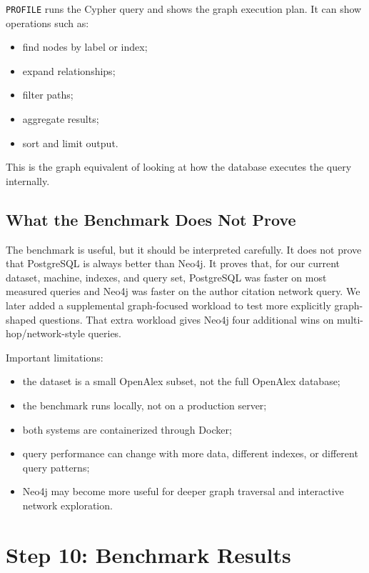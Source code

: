 \documentclass[11pt]{article}
\begin{document}
\texttt{PROFILE} runs the Cypher query and shows the graph execution plan.
It can show operations such as:

\begin{itemize}
    \item find nodes by label or index;
    \item expand relationships;
    \item filter paths;
    \item aggregate results;
    \item sort and limit output.
\end{itemize}

This is the graph equivalent of looking at how the database executes the query internally.

\subsection{What the Benchmark Does Not Prove}

The benchmark is useful, but it should be interpreted carefully.
It does not prove that PostgreSQL is always better than Neo4j.
It proves that, for our current dataset, machine, indexes, and query set, PostgreSQL was faster on most measured queries and Neo4j was faster on the author citation network query.
We later added a supplemental graph-focused workload to test more explicitly graph-shaped questions.
That extra workload gives Neo4j four additional wins on multi-hop/network-style queries.

Important limitations:

\begin{itemize}
    \item the dataset is a small OpenAlex subset, not the full OpenAlex database;
    \item the benchmark runs locally, not on a production server;
    \item both systems are containerized through Docker;
    \item query performance can change with more data, different indexes, or different query patterns;
    \item Neo4j may become more useful for deeper graph traversal and interactive network exploration.
\end{itemize}

\section{Step 10: Benchmark Results}
\end{document}
